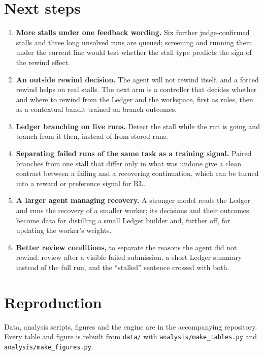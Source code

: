 \documentclass{article}
\begin{document}
\section{Next steps}
\label{sec:next}

\begin{enumerate}[leftmargin=*,itemsep=1pt,topsep=2pt]
  \item \textbf{More stalls under one feedback wording.} Six further judge-confirmed stalls and three long unsolved runs
  are queued; screening and running them under the current line would test whether the stall type predicts the sign of
  the rewind effect.
  \item \textbf{An outside rewind decision.} The agent will not rewind itself, and a forced rewind helps on real
  stalls. The next arm is a controller that decides whether and where to rewind from the Ledger and the workspace, first
  as rules, then as a contextual bandit trained on branch outcomes.
  \item \textbf{Ledger branching on live runs.} Detect the stall while the run is going and branch from it then,
  instead of from stored runs.
  \item \textbf{Separating failed runs of the same task as a training signal.} Paired branches from one stall that
  differ only in what was undone give a clean contrast between a failing and a recovering continuation, which can be
  turned into a reward or preference signal for RL.
  \item \textbf{A larger agent managing recovery.} A stronger model reads the Ledger and runs the recovery of a
  smaller worker; its decisions and their outcomes become data for distilling a small Ledger builder and, further
  off, for updating the worker's weights.
  \item \textbf{Better review conditions,} to separate the reasons the agent did not rewind: review after a visible
  failed submission, a short Ledger summary instead of the full run, and the ``stalled'' sentence crossed with both.
\end{enumerate}

\section*{Reproduction}
Data, analysis scripts, figures and the engine are in the accompanying repository. Every table and figure is rebuilt
from \texttt{data/} with \texttt{analysis/make\_tables.py} and \texttt{analysis/make\_figures.py}.



\end{document}
